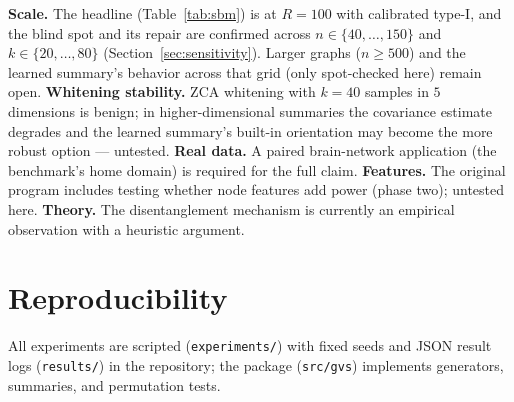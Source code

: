 \documentclass[11pt]{article}
\begin{document}
\textbf{Scale.} The headline (Table~\ref{tab:sbm}) is at $R = 100$ with
calibrated type-I, and the blind spot and its repair are confirmed across
$n \in \{40, \dots, 150\}$ and $k \in \{20, \dots, 80\}$
(Section~\ref{sec:sensitivity}). Larger graphs ($n \ge 500$) and the
learned summary's behavior across that grid (only spot-checked here) remain
open.
\textbf{Whitening stability.} ZCA whitening with $k = 40$ samples in $5$
dimensions is benign; in higher-dimensional summaries the covariance estimate
degrades and the learned summary's built-in orientation may become the more
robust option --- untested.
\textbf{Real data.} A paired brain-network application (the benchmark's home
domain) is required for the full claim.
\textbf{Features.} The original program includes testing whether node features
add power (phase two); untested here.
\textbf{Theory.} The disentanglement mechanism is currently an empirical
observation with a heuristic argument.

\section*{Reproducibility}

All experiments are scripted (\texttt{experiments/}) with fixed seeds and JSON
result logs (\texttt{results/}) in the repository; the package
(\texttt{src/gvs}) implements generators, summaries, and permutation tests.
\end{document}
